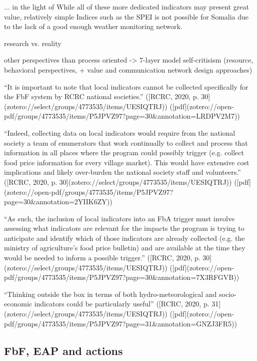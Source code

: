 ... in the light of
While all of these more dedicated indicators may present great value, relatively simple Indices such as the SPEI is not possible for Somalia due to the lack of a good enough weather monitoring network. 



research vs. reality

other perspectives than process oriented -> 7-layer model self-critisism (resource, behavioral perspectives, + value and communication network design approaches)

“It is important to note that local indicators cannot be collected specifically for the FbF system by RCRC national societies.” ([RCRC, 2020, p. 30](zotero://select/groups/4773535/items/UESIQTRJ)) ([pdf](zotero://open-pdf/groups/4773535/items/P5JPVZ97?page=30&annotation=LRDPV2M7))

“Indeed, collecting data on local indicators would require from the national society a team of enumerators that work continually to collect and process that information in all places where the program could possibly trigger (e.g. collect food price information for every village market). This would have extensive cost implications and likely over-burden the national society staff and volunteers.” ([RCRC, 2020, p. 30](zotero://select/groups/4773535/items/UESIQTRJ)) ([pdf](zotero://open-pdf/groups/4773535/items/P5JPVZ97?page=30&annotation=2YIIK6ZY))

“As such, the inclusion of local indicators into an FbA trigger must involve assessing what indicators are relevant for the impacts the program is trying to anticipate and identify which of those indicators are already collected (e.g. the ministry of agriculture's food price bulletin) and are available at the time they would be needed to inform a possible trigger.” ([RCRC, 2020, p. 30](zotero://select/groups/4773535/items/UESIQTRJ)) ([pdf](zotero://open-pdf/groups/4773535/items/P5JPVZ97?page=30&annotation=7X3RFGVB))

“Thinking outside the box in terms of both hydro-meteorological and socio-economic indicators could be particularly useful” ([RCRC, 2020, p. 31](zotero://select/groups/4773535/items/UESIQTRJ)) ([pdf](zotero://open-pdf/groups/4773535/items/P5JPVZ97?page=31&annotation=GNZJ3FR5))




\subsection{FbF, EAP and actions}


